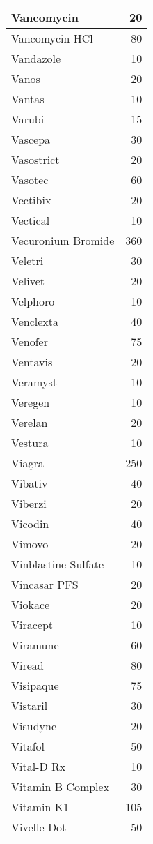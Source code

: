 \documentclass[
]{article}
\begin{document}
\begin{table}
\begin{tabular}[t]{l|r}
Vancomycin & 20\\
\hline
Vancomycin HCl & 80\\
\hline
Vandazole & 10\\
\hline
Vanos & 20\\
\hline
Vantas & 10\\
\hline
Varubi & 15\\
\hline
Vascepa & 30\\
\hline
Vasostrict & 20\\
\hline
Vasotec & 60\\
\hline
Vectibix & 20\\
\hline
Vectical & 10\\
\hline
Vecuronium Bromide & 360\\
\hline
Veletri & 30\\
\hline
Velivet & 20\\
\hline
Velphoro & 10\\
\hline
Venclexta & 40\\
\hline
Venofer & 75\\
\hline
Ventavis & 20\\
\hline
Veramyst & 10\\
\hline
Veregen & 10\\
\hline
Verelan & 20\\
\hline
Vestura & 10\\
\hline
Viagra & 250\\
\hline
Vibativ & 40\\
\hline
Viberzi & 20\\
\hline
Vicodin & 40\\
\hline
Vimovo & 20\\
\hline
Vinblastine Sulfate & 10\\
\hline
Vincasar PFS & 20\\
\hline
Viokace & 20\\
\hline
Viracept & 10\\
\hline
Viramune & 60\\
\hline
Viread & 80\\
\hline
Visipaque & 75\\
\hline
Vistaril & 30\\
\hline
Visudyne & 20\\
\hline
Vitafol & 50\\
\hline
Vital-D Rx & 10\\
\hline
Vitamin B Complex & 30\\
\hline
Vitamin K1 & 105\\
\hline
Vivelle-Dot & 50\\

\end{tabular}
\end{table}
\end{document}
